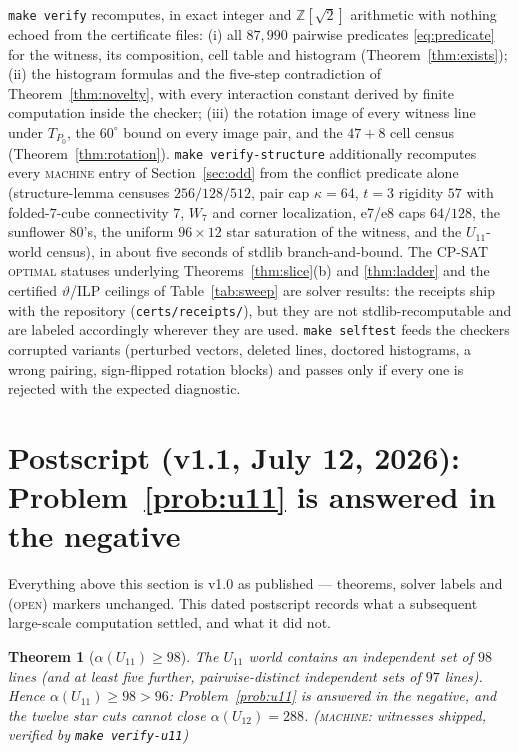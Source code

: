 \documentclass[11pt]{article}
\newtheorem{theorem}{Theorem}
\theoremstyle{remark}
\newcommand{\ZZ}{\mathbb{Z}}
\begin{document}
\texttt{make verify} recomputes, in exact integer and $\ZZ[\sqrt2]$
arithmetic with nothing echoed from the certificate files:
(i) all $87{,}990$ pairwise predicates \eqref{eq:predicate} for the
witness, its composition, cell table and histogram
(Theorem~\ref{thm:exists});
(ii) the histogram formulas and the five-step contradiction of
Theorem~\ref{thm:novelty}, with every interaction constant derived by
finite computation inside the checker;
(iii) the rotation image of every witness line under $T_{P_0}$, the
$60^\circ$ bound on every image pair, and the
$47{+}8$ cell census (Theorem~\ref{thm:rotation}).
\texttt{make verify-structure} additionally recomputes every
\textsc{machine} entry of Section~\ref{sec:odd} from the conflict
predicate alone (structure-lemma censuses $256/128/512$, pair cap
$\kappa=64$, $t{=}3$ rigidity $57$ with folded-$7$-cube connectivity $7$,
$W_7$ and corner localization, e7/e8 caps $64/128$, the sunflower $80$'s,
the uniform $96{\times}12$ star saturation of the witness, and the
$U_{11}$-world census), in about five seconds of stdlib branch-and-bound.
The CP-SAT \textsc{optimal} statuses underlying
Theorems~\ref{thm:slice}(b) and \ref{thm:ladder} and the certified
$\vartheta$/ILP ceilings of Table~\ref{tab:sweep} are solver results: the
receipts ship with the repository (\texttt{certs/receipts/}), but they are
not stdlib-recomputable and are labeled accordingly wherever they are
used. \texttt{make selftest} feeds the checkers corrupted variants
(perturbed vectors, deleted lines, doctored histograms, a wrong pairing,
sign-flipped rotation blocks) and passes only if every one is rejected
with the expected diagnostic.

\section{Postscript (v1.1, July 12, 2026): Problem~\ref{prob:u11} is
answered in the negative}\label{sec:postscript}

Everything above this section is v1.0 as published --- theorems, solver
labels and \textsc{(open)} markers unchanged. This dated postscript records
what a subsequent large-scale computation settled, and what it did not.

\begin{theorem}[$\alpha(U_{11})\ge98$]\label{thm:u11witness}
The $U_{11}$ world contains an independent set of $98$ lines (and at least
five further, pairwise-distinct independent sets of $97$ lines). Hence
$\alpha(U_{11})\ge98>96$: Problem~\ref{prob:u11} is answered in the
negative, and the twelve star cuts cannot close $\alpha(U_{12})=288$.
\textsc{(machine}: witnesses shipped, verified by
\texttt{make verify-u11}\textsc{)}
\end{theorem}
\end{document}
